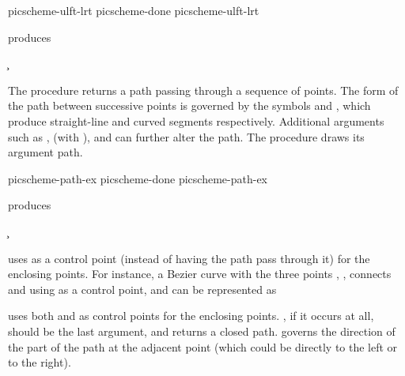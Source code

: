 
\verbwritefile picscheme-ulft-lrt
\verbwritefile picscheme-done
\scminput picscheme-ulft-lrt

\n produces

\quote
\c{ }
\endquote


\n The procedure  returns a path
passing through a sequence of points.
The form of the path between successive points is
governed by the symbols \q{--} and \q{**}, which produce straight-line
and curved segments respectively.  Additional arguments such
as ,  (with ), and 
can further alter the path.
The procedure
 draws its argument path.

\verbwritefile picscheme-path-ex
\verbwritefile picscheme-done
\scminput picscheme-path-ex

\n produces

\quote
\c{ }
\endquote

\n {}
uses  as a control point (instead of having the path pass through it) for
the enclosing points.
For instance, a Bezier curve with the three points
, , 
connects  and  using
 as a control point, and can be represented as


 uses both  and  as control points
for the enclosing points.
, if it occurs at all, should be the
last argument, and returns a closed path.  
governs the direction of the part of the path at
the adjacent point (which could be directly to the left or to the right).

